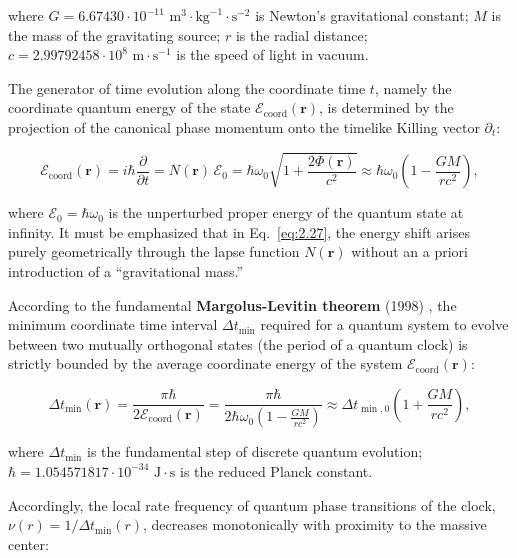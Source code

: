 where $G = 6.67430 \cdot 10^{-11}\text{ m}^3\cdot\text{kg}^{-1}\cdot\text{s}^{-2}$ is Newton's gravitational constant;  
$M$ is the mass of the gravitating source;  
$r$ is the radial distance;  
$c = 2.99792458 \cdot 10^8\text{ m}\cdot\text{s}^{-1}$ is the speed of light in vacuum.

The generator of time evolution along the coordinate time $t$, namely the coordinate quantum energy of the state $\mathcal{E}_{\text{coord}}(\mathbf{r})$, is determined by the projection of the canonical phase momentum onto the timelike Killing vector $\partial_t$:

\begin{equation}\label{eq:2.27}\label{eq:2.77}\tag{2.27}
\mathcal{E}_{\text{coord}}(\mathbf{r}) = i\hbar \frac{\partial}{\partial t} = N(\mathbf{r}) \, \mathcal{E}_0 = \hbar \omega_0 \sqrt{1 + \frac{2\Phi(\mathbf{r})}{c^2}} \approx \hbar \omega_0 \left( 1 - \frac{GM}{r c^2} \right),
\end{equation}

where $\mathcal{E}_0 = \hbar \omega_0$ is the unperturbed proper energy of the quantum state at infinity. It must be emphasized that in Eq.~\eqref{eq:2.27}, the energy shift arises purely geometrically through the lapse function $N(\mathbf{r})$ without an a priori introduction of a ``gravitational mass.''

According to the fundamental \textbf{Margolus-Levitin theorem} (1998) \cite{ref16}, the minimum coordinate time interval $\Delta t_{\min}$ required for a quantum system to evolve between two mutually orthogonal states (the period of a quantum clock) is strictly bounded by the average coordinate energy of the system $\mathcal{E}_{\text{coord}}(\mathbf{r})$:

\begin{equation}\label{eq:2.28}\label{eq:2.78}\tag{2.28}
\Delta t_{\min}(\mathbf{r}) = \frac{\pi \hbar}{2 \mathcal{E}_{\text{coord}}(\mathbf{r})} = \frac{\pi \hbar}{2 \hbar \omega_0 \left( 1 - \frac{GM}{r c^2} \right)} \approx \Delta t_{\min, 0} \left( 1 + \frac{GM}{r c^2} \right),
\end{equation}

where $\Delta t_{\min}$ is the fundamental step of discrete quantum evolution;  
$\hbar = 1.054571817 \cdot 10^{-34}\text{ J}\cdot\text{s}$ is the reduced Planck constant.

Accordingly, the local rate frequency of quantum phase transitions of the clock, $\nu(r) = 1/\Delta t_{\min}(r)$, decreases monotonically with proximity to the massive center:

